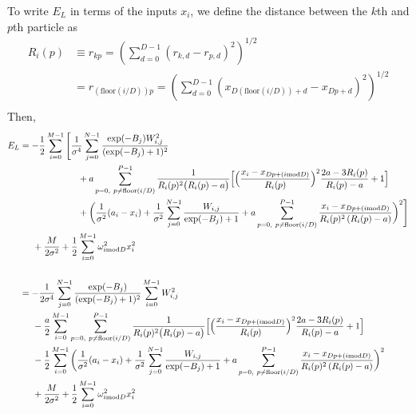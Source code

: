 \documentclass[12pt]{article}
\begin{document}
\noindent To write $E_L$ in terms of the inputs $x_i$, we define the distance between the $k$th and $p$th particle as
\begin{align*}
R_i(p) &\equiv r_{kp}= \left( \sum_{d=0}^{D-1} (r_{k,d}-r_{p,d})^2 \right)^{1/2}\\
 &= r_{(\text{floor}(i/D))p} 
 = \left( \sum_{d=0}^{D-1} (x_{D(\text{floor}(i/D))+d}-x_{Dp+d})^2 \right)^{1/2}\\
\end{align*}
\noindent Then,
\begin{align*}
E_L &= -\frac{1}{2} \sum_{i=0}^{M-1}
\Bigg[ \frac{1}{\sigma^4} \sum_{j=0}^{N-1} \frac{\exp(-B_j)W_{i,j}^2}{(\exp(-B_j)+1)^2}\\
& \hspace*{2.25 cm}
+ a \sum_{p=0, \ p\neq \text{floor}(i/D)}^{P-1}  \frac{1}{R_i(p)^2 \big( R_i(p)-a \big)}
\Big[ 
\Big( \frac{x_i-x_{Dp+(i\text{mod}D)}}{R_i(p)} \Big)^2 \frac{2a-3R_i(p)}{R_i(p)-a}
 +1
\Big]  \\
& \hspace*{2.25 cm}
+ \bigg( 
\frac{1}{\sigma^2} (a_i -x_i )
+\frac{1}{\sigma^2} \sum_{j=0}^{N-1}  \frac{W_{i,j}}{\exp(-B_j)+1}
+a\sum_{p=0, \ p\neq \text{floor}(i/D)}^{P-1} \frac{x_i-x_{Dp+(i\text{mod}D)}}{R_i(p)^2 \left( R_i(p) -a \right)}
 \bigg)^2  \Bigg]\\
& \hspace*{.5 cm} + \frac{M}{2\sigma^2}+ \frac{1}{2} \sum_{i=0}^{M-1} \omega_{i\text{mod}D}^2x_i^2\\ \\ 
&=-\frac{1}{2\sigma^4} \sum_{j=0}^{N-1}\frac{\exp(-B_j)}{(\exp(-B_j)+1)^2} \sum_{i=0}^{M-1}W_{i,j}^2 \\
& \hspace*{.5 cm}
-\frac{a}{2} \sum_{i=0}^{M-1} \sum_{p=0, \ p\neq \text{floor}(i/D)}^{P-1}\frac{1}{R_i(p)^2 \big( R_i(p)-a \big)}\Big[ \Big( \frac{x_i-x_{Dp+(i\text{mod}D)}}{R_i(p)} \Big)^2 \frac{2a-3R_i(p)}{R_i(p)-a}+1\Big]  \\
& \hspace*{.5 cm}
-\frac{1}{2} \sum_{i=0}^{M-1} \bigg( 
\frac{1}{\sigma^2}(a_i -x_i )
+\frac{1}{\sigma^2} \sum_{j=0}^{N-1}  \frac{W_{i,j}}{\exp(-B_j)+1}
+a\sum_{p=0, \ p\neq \text{floor}(i/D)}^{P-1} \frac{x_i-x_{Dp+(i\text{mod}D)}}{R_i(p)^2 \left( R_i(p) -a \right)}
 \bigg)^2\\
 & \hspace*{.5 cm} + \frac{M}{2\sigma^2}+\frac{1}{2} \sum_{i=0}^{M-1} \omega_{i\text{mod}D}^2x_i^2\\ \\ 

\end{align*}
\end{document}
